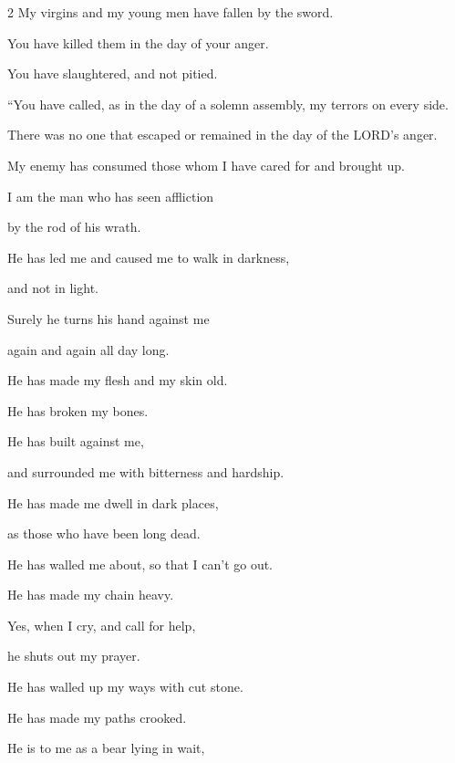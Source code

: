 \begin{multicols}{2}
	My virgins and my young men have fallen by the sword.
	
	You have killed them in the day of your anger.
	
	You have slaughtered, and not pitied.
	\vspace{\baselineskip}
	
	\myverse{}“You have called, as in the day of a solemn assembly, my terrors
	on every side.
	
	There was no one that escaped or remained in the day of the LORD’s anger.
	
	My enemy has consumed those whom I have cared for and brought up.
	
	\mychapter{} \myverse*{}I am the man who has seen affliction
	
	by the rod of his wrath.
	
	\myverse{}He has led me and caused me to walk in darkness,
	
	and not in light.
	
	\myverse{}Surely he turns his hand against me
	
	again and again all day long.

	\vspace{\baselineskip}
	
	\myverse{}He has made my flesh and my skin old.
	
	He has broken my bones.
	
	\myverse{}He has built against me,
	
	and surrounded me with bitterness and hardship.
	
	\myverse{}He has made me dwell in dark places,
	
	as those who have been long dead.

	\vspace{\baselineskip}
	
	\myverse{}He has walled me about, so that I can’t go out.
	
	He has made my chain heavy.
	
	\myverse{}Yes, when I cry, and call for help,
	
	he shuts out my prayer.
	
	\myverse{}He has walled up my ways with cut stone.
	
	He has made my paths crooked.

	\vspace{\baselineskip}
	
	\myverse{}He is to me as a bear lying in wait,
	

\end{multicols}
